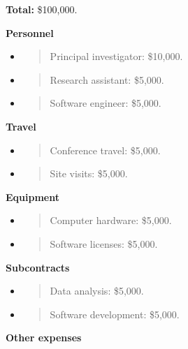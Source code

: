 \textbf{Total:} \$100,000.

\textbf{Personnel}

\begin{itemize}
\item
  \begin{quote}
  Principal investigator: \$10,000.
  \end{quote}
\item
  \begin{quote}
  Research assistant: \$5,000.
  \end{quote}
\item
  \begin{quote}
  Software engineer: \$5,000.
  \end{quote}
\end{itemize}

\textbf{Travel}

\begin{itemize}
\item
  \begin{quote}
  Conference travel: \$5,000.
  \end{quote}
\item
  \begin{quote}
  Site visits: \$5,000.
  \end{quote}
\end{itemize}

\textbf{Equipment}

\begin{itemize}
\item
  \begin{quote}
  Computer hardware: \$5,000.
  \end{quote}
\item
  \begin{quote}
  Software licenses: \$5,000.
  \end{quote}
\end{itemize}

\textbf{Subcontracts}

\begin{itemize}
\item
  \begin{quote}
  Data analysis: \$5,000.
  \end{quote}
\item
  \begin{quote}
  Software development: \$5,000.
  \end{quote}
\end{itemize}

\textbf{Other expenses}

